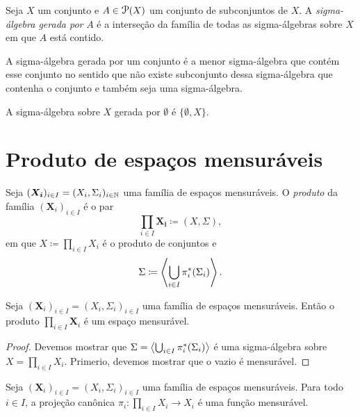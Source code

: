 \begin{defi}
	Seja $X$ um conjunto e $A \in \p(X)$ um conjunto de subconjuntos de $X$. A \emph{sigma-álgebra gerada por} $A$ é a interseção da família de todas as sigma-álgebras sobre $X$ em que $A$ está contido.
\end{defi}
	
	A sigma-álgebra gerada por um conjunto é a menor sigma-álgebra que contém esse conjunto no sentido que não existe subconjunto dessa sigma-álgebra que contenha o conjunto e também seja uma sigma-álgebra.

\begin{ex}
	A sigma-álgebra sobre $X$ gerada por $\emptyset$ é $\{\emptyset, X\}$.
\end{ex}

\section{Produto de espaços mensuráveis}

\begin{defi}
Seja $(\bm{X_i})_{i \in I} = (X_i,\Sigma_i)_{i \in \mathbb{N}}$ uma família de espaços mensuráveis. O \emph{produto} da família $(\bm X_i)_{i \in I}$ é o par
	\begin{equation*}
	\prod_{i \in I} \bm{X_i} \coloneqq (X,\Sigma),
	\end{equation*}
em que $X \coloneqq \prod_{i \in I} X_i$ é o produto de conjuntos e
	\begin{equation*}
	\Sigma \coloneqq \ger{\bigcup_{i \in I} \pi_i^*(\Sigma_i)}.
	\end{equation*}
\end{defi}

\begin{prop}
Seja $(\bm X_i)_{i \in I} = (X_i,\Sigma_i)_{i \in I}$ uma família de espaços mensuráveis. Então o produto $\prod_{i \in I} \bm X_i$ é um espaço mensurável.
\end{prop}
\begin{proof}
Devemos mostrar que $\Sigma=\left\langle \bigcup_{i \in I} \pi_i^*(\Sigma_i) \right\rangle$ é uma sigma-álgebra sobre $X= \prod_{i \in I} X_i$. Primerio, devemos mostrar que o vazio é mensurável.
\end{proof}








\begin{prop}
Seja $(\bm X_i)_{i \in I} = (X_i,\Sigma_i)_{i \in I}$ uma família de espaços mensuráveis. Para todo $i \in I$, a projeção canônica $\pi_i: \prod_{i \in I} X_i \to X_i$ é uma função mensurável.
\end{prop}







